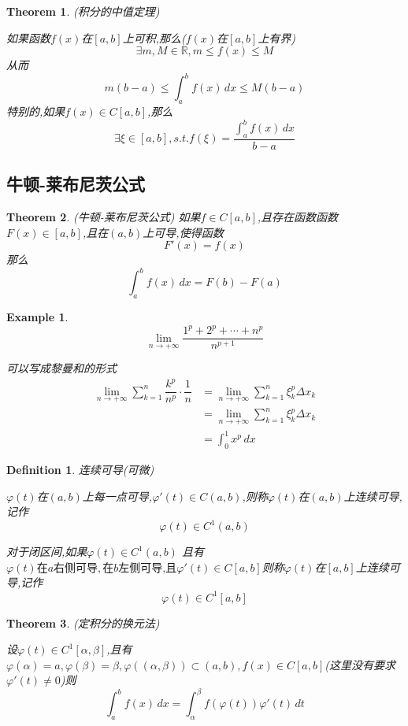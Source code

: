 \documentclass[11pt,hyperref,a4paper,UTF8]{ctexart}
\newtheorem{theorem}{Theorem}[subsection]
\newtheorem{example}{Example}[subsection]
\newtheorem{definition}{Definition}[subsection]
\newcommand{\RR}{\mathbb{R}}
\begin{document}
\begin{CJK}{UTF8}{gkai}
\begin{theorem}
  (积分的中值定理)

  如果函数$f(x)$在$[a,b]$上可积,那么($f(x)$在$[a,b]$上有界)
  \[\exists m,M \in \RR,  m \leq f(x) \leq M\]
  从而
  \[m(b - a) \leq\int_{a}^{b}f(x)\,dx \leq M (b - a)\]
  特别的,如果$f(x)\in C[a,b]$,那么
  \[\exists\xi \in [a,b],s.t.f(\xi) = \dfrac{\int_{a}^{b}f(x)\, dx}{b - a}\]
\end{theorem}
\subsection{牛顿-莱布尼茨公式}
\begin{theorem}
  (牛顿-莱布尼茨公式)
  如果$f\in C[a,b]$,且存在函数函数$F(x) \in [a,b]$,且在$(a,b)$上可导,使得函数\[F'(x) = f(x)\]
  那么
  \[\int_{a}^{b}f(x)\,dx = F(b) - F(a)\]

\end{theorem}

\begin{example}
  \[\lim_{n\to +\infty} \dfrac{1^p + 2 ^ p +\cdots + n^p}{n^{p + 1}}\]

  可以写成黎曼和的形式
  \[
  \begin{aligned}  
  \lim_{n\to +\infty}\sum_{k = 1}^{n} \dfrac{k^p}{n^p} \cdot \dfrac{1}{n}&=\lim_{n\to +\infty}\sum_{k = 1}^{n} \xi_k^p \Delta x_k\\
  &=\lim_{n\to +\infty}\sum_{k = 1}^{n} \xi_k^p \Delta x_k\\
  &=\int_{0}^{1}x^p\,dx 
  \end{aligned}
  \]
  
\end{example}


\begin{definition}
连续可导(可微)

$\varphi(t)$在$(a,b)$上每一点可导,$\varphi'(t) \in C(a,b)$,则称$\varphi(t)$在$(a,b)$上连续可导,记作
\[\varphi(t) \in C^1 (a,b)\]

对于闭区间,如果$\varphi(t) \in C^1 (a,b)$
且有
$\varphi(t)\text{在}a\text{右侧可导},\text{在}b\text{左侧可导,且} \varphi'(t) \in C[a,b]$则称$\varphi(t)$在$[a,b]$上连续可导,记作
\[\varphi(t) \in C^1 [a,b]\]
\end{definition}

\begin{theorem}
  (定积分的换元法)

  设$\varphi(t) \in C^1[\alpha,\beta]$,且有$\varphi(\alpha) = a , \varphi(\beta) = \beta , \varphi((\alpha,\beta)) \subset (a,b),f(x) \in C[a,b]$(这里没有要求$\varphi'(t) \neq 0$)则
  \[\int_{a}^{b}f(x)\,dx = \int_{\alpha}^{\beta}f(\varphi(t))\varphi'(t)\,dt\]


\end{theorem}
\end{CJK}
\end{document}
